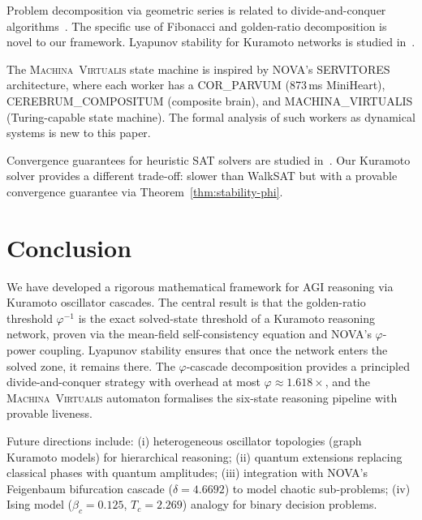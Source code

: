 \documentclass[12pt]{article}
\newcommand{\PHI}{\varphi}
\newcommand{\PHIINV}{\varphi^{-1}}
\newcommand{\MV}{\textsc{Machina~Virtualis}}
\begin{document}
Problem decomposition via geometric series is related to divide-and-conquer
algorithms~\cite{Cormen2009}.  The specific use of Fibonacci and golden-ratio
decomposition is novel to our framework.  Lyapunov stability for Kuramoto
networks is studied in~\cite{Chopra2009,Dorfler2014}.

The \MV{} state machine is inspired by NOVA's SERVITORES architecture, where
each worker has a COR\_PARVUM (873\,ms MiniHeart), CEREBRUM\_COMPOSITUM
(composite brain), and MACHINA\_VIRTUALIS (Turing-capable state machine).  The
formal analysis of such workers as dynamical systems is new to this paper.

Convergence guarantees for heuristic SAT solvers are studied
in~\cite{Selman1994,Flaxman2003}.  Our Kuramoto solver provides a different
trade-off: slower than WalkSAT but with a provable convergence guarantee via
Theorem~\ref{thm:stability-phi}.

\section{Conclusion}
\label{sec:conclusion}

We have developed a rigorous mathematical framework for AGI reasoning via
Kuramoto oscillator cascades.  The central result is that the golden-ratio
threshold $\PHIINV$ is the exact solved-state threshold of a Kuramoto reasoning
network, proven via the mean-field self-consistency equation and NOVA's
$\PHI$-power coupling.  Lyapunov stability ensures that once the network enters
the solved zone, it remains there.  The $\varphi$-cascade decomposition provides
a principled divide-and-conquer strategy with overhead at most $\PHI \approx
1.618\times$, and the \MV{} automaton formalises the six-state reasoning
pipeline with provable liveness.

Future directions include: (i) heterogeneous oscillator topologies (graph
Kuramoto models) for hierarchical reasoning; (ii) quantum extensions replacing
classical phases with quantum amplitudes; (iii) integration with NOVA's
Feigenbaum bifurcation cascade ($\delta = 4.6692$) to model chaotic
sub-problems; (iv) Ising model ($\beta_c = 0.125$, $T_c = 2.269$) analogy for
binary decision problems.
\end{document}
